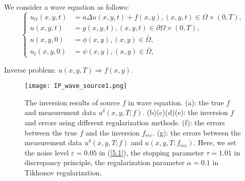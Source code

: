 \documentclass[mathserif,envcountsect,compress,8pt]{beamer}
\begin{document}
\begin{frame}
	We consider a wave equation as follows:
	\begin{equation}
		\left\{\begin{aligned}
			u_{tt}(x,y,t) & = a\Delta u(x,y,t) + f(x,y), (x,y,t)\in\Omega\times(0,T), \\
			u(x,y,t)      & = g(x,y,t), (x,y,t)\in \partial\Omega\times (0,T),        \\
			u(x,y,0)      & = \phi(x,y), (x,y)\in\bar\Omega,                          \\
			u_t(x,y,0)    & = \psi(x,y), (x,y)\in\bar\Omega,
		\end{aligned}\right.
		\label{wave}
	\end{equation}
	
	Inverse problem: $u(x,y,T) \Rightarrow f(x,y)$.
\end{frame}


\begin{frame}

	\begin{figure}[H]
		\centering
		\begin{minipage}[t]{0.8\linewidth}
			\centering
			\texttt{[image: IP\_wave\_source1.png]}
		\end{minipage}
		\centering
		\label{fig_1}
		\caption{The inversion results of source $f$ in wave equation. (a): the true $f$ and measurement data $u^\delta(x,y,T; f)$. (b)(c)(d)(e): the inversion $f$ and errors using different regularization methods. (f): the errors between the true $f$ and the inversion $f_{rec}$. (g): the errors between the measurement data $u^\delta(x,y,T;f)$ and $u(x,y,T;f_{rec})$. Here, we set the noise level $\varepsilon=0.05$ in (\ref{5.1}), the stopping parameter $\tau=1.01$ in discrepancy principle, the regularization parameter $\alpha=0.1$ in Tikhonov regularization.}
		\label{f1_figure}
	\end{figure}
\end{frame}
\end{document}
